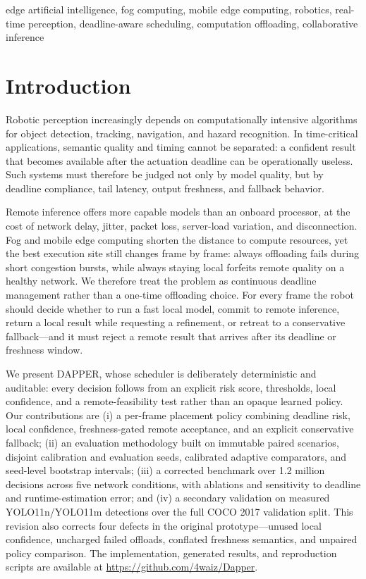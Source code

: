 \documentclass[conference,a4paper]{IEEEtran}
\begin{document}
\begin{IEEEkeywords}
edge artificial intelligence, fog computing, mobile edge computing, robotics, real-time perception, deadline-aware scheduling, computation offloading, collaborative inference
\end{IEEEkeywords}

\section{Introduction}
Robotic perception increasingly depends on computationally intensive algorithms for object detection, tracking, navigation, and hazard recognition. In time-critical applications, semantic quality and timing cannot be separated: a confident result that becomes available after the actuation deadline can be operationally useless. Such systems must therefore be judged not only by model quality, but by deadline compliance, tail latency, output freshness, and fallback behavior.

Remote inference offers more capable models than an onboard processor, at the cost of network delay, jitter, packet loss, server-load variation, and disconnection. Fog and mobile edge computing shorten the distance to compute resources, yet the best execution site still changes frame by frame: always offloading fails during short congestion bursts, while always staying local forfeits remote quality on a healthy network. We therefore treat the problem as continuous deadline management rather than a one-time offloading choice. For every frame the robot should decide whether to run a fast local model, commit to remote inference, return a local result while requesting a refinement, or retreat to a conservative fallback---and it must reject a remote result that arrives after its deadline or freshness window.

We present DAPPER, whose scheduler is deliberately deterministic and auditable: every decision follows from an explicit risk score, thresholds, local confidence, and a remote-feasibility test rather than an opaque learned policy. Our contributions are (i) a per-frame placement policy combining deadline risk, local confidence, freshness-gated remote acceptance, and an explicit conservative fallback; (ii) an evaluation methodology built on immutable paired scenarios, disjoint calibration and evaluation seeds, calibrated adaptive comparators, and seed-level bootstrap intervals; (iii) a corrected benchmark over 1.2 million decisions across five network conditions, with ablations and sensitivity to deadline and runtime-estimation error; and (iv) a secondary validation on measured YOLO11n/YOLO11m detections over the full COCO 2017 validation split. This revision also corrects four defects in the original prototype---unused local confidence, uncharged failed offloads, conflated freshness semantics, and unpaired policy comparison. The implementation, generated results, and reproduction scripts are available at \url{https://github.com/4waiz/Dapper}.
\end{document}
